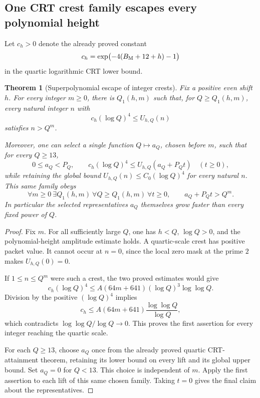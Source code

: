 \documentclass[11pt]{article}
\newtheorem{theorem}{Theorem}[section]
\begin{document}
\subsection{One CRT crest family escapes every polynomial height}
Let \(c_h>0\) denote the already proved constant
\[
 c_h=\exp\bigl(-4(B_{\rm M}+12+h)-1\bigr)
\]
in the quartic logarithmic CRT lower bound.

\begin{theorem}[Superpolynomial escape of integer crests]\label{thm:superpolynomial-crest-escape}
Fix a positive even shift \(h\).
For every integer \(m\geq0\), there is \(Q_1(h,m)\) such that,
for \(Q\geq Q_1(h,m)\), every natural integer \(n\) with
\[
                     c_h(\log Q)^4\leq U_{h,Q}(n)
\]
satisfies \(n>Q^m\).

Moreover, one can select a single function \(Q\mapsto a_Q\),
chosen before \(m\), such that for every \(Q\geq13\),
\[
 0\leq a_Q<P_Q,\qquad
 c_h(\log Q)^4\leq U_{h,Q}(a_Q+P_Qt)\quad(t\geq0),
\]
while retaining the global bound
\(U_{h,Q}(n)\leq C_0(\log Q)^4\) for every natural \(n\).
This same family obeys
\[
 \forall m\geq0\ \exists Q_1(h,m)\
   \forall Q\geq Q_1(h,m)\ \forall t\geq0,\qquad
                         a_Q+P_Qt>Q^m.
\]
In particular the selected representatives \(a_Q\) themselves grow
faster than every fixed power of \(Q\).
\end{theorem}
\begin{proof}
Fix \(m\). For all sufficiently large \(Q\), one has \(h<Q\),
\(\log Q>0\), and the polynomial-height amplitude estimate holds.
A quartic-scale crest has positive packet value. It cannot occur at
\(n=0\), since the local zero mask at the prime \(2\) makes
\(U_{h,Q}(0)=0\).

If \(1\leq n\leq Q^m\) were such a crest, the two proved estimates
would give
\[
 c_h(\log Q)^4\leq
       A(64m+641)(\log Q)^3\log\log Q.
\]
Division by the positive \((\log Q)^4\) implies
\[
                  c_h\leq
                  A(64m+641)\frac{\log\log Q}{\log Q},
\]
which contradicts \(\log\log Q/\log Q\to0\). This proves the first
assertion for every integer reaching the quartic scale.

For each \(Q\geq13\), choose \(a_Q\) once from the already proved
quartic CRT-attainment theorem, retaining its lower bound on every
lift and its global upper bound. Set \(a_Q=0\) for \(Q<13\).
This choice is independent of \(m\). Apply the first assertion to
each lift of this same chosen family. Taking \(t=0\) gives the final
claim about the representatives.
\end{proof}
\end{document}
